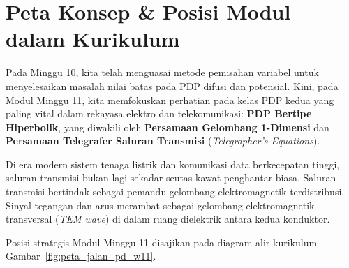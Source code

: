 \documentclass[11pt,a4paper]{article}
\theoremstyle{definition}
\begin{document}
\vspace{0.3cm}
\tableofcontents
\vspace{0.5cm}

\newpage

\section{Peta Konsep \& Posisi Modul dalam Kurikulum}

Pada Minggu 10, kita telah menguasai metode pemisahan variabel untuk menyelesaikan masalah nilai batas pada PDP difusi dan potensial. Kini, pada Modul Minggu 11, kita memfokuskan perhatian pada kelas PDP kedua yang paling vital dalam rekayasa elektro dan telekomunikasi: \textbf{PDP Bertipe Hiperbolik}, yang diwakili oleh \textbf{Persamaan Gelombang 1-Dimensi} dan \textbf{Persamaan Telegrafer Saluran Transmisi} (\textit{Telegrapher's Equations}).

Di era modern sistem tenaga listrik dan komunikasi data berkecepatan tinggi, saluran transmisi bukan lagi sekadar seutas kawat penghantar biasa. Saluran transmisi bertindak sebagai pemandu gelombang elektromagnetik terdistribusi. Sinyal tegangan dan arus merambat sebagai gelombang elektromagnetik transversal (\textit{TEM wave}) di dalam ruang dielektrik antara kedua konduktor.

Posisi strategis Modul Minggu 11 disajikan pada diagram alir kurikulum Gambar~\ref{fig:peta_jalan_pd_w11}.
\end{document}
